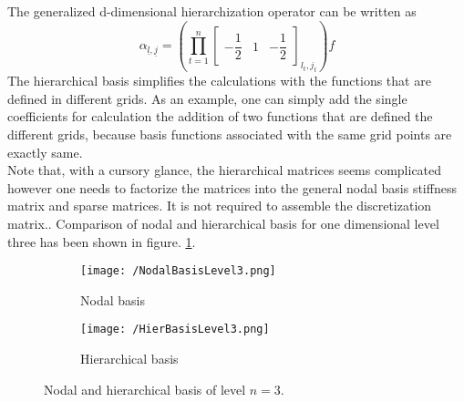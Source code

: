 The generalized d-dimensional hierarchization operator can be written as
\begin{equation}
    \alpha_{\underline{l},\underline{j}} = \left( \prod_{t=1}^{n}
    \left[
    \begin{array}{ccc}
	    -\dfrac{1}{2} & 1 & -\dfrac{1}{2}
    \end{array}
    \right]_{l_t,j_t}
     \right) f
\end{equation}
The hierarchical basis simplifies the calculations with the functions that are defined in different grids. As an example, one can simply add the single coefficients for calculation the addition of two functions that are defined the different grids, because basis functions associated with the same grid points are exactly same\cite{Griebel1992b}.\\
Note that, with a cursory glance, the hierarchical matrices seems complicated however one needs to factorize the matrices into the general nodal basis stiffness matrix and sparse matrices. It is not required to assemble the discretization matrix.\cite{Yserentant1986}. 
Comparison of nodal and hierarchical basis for one dimensional level three has been shown in figure. \ref{fig:NodalHierBasisLevel3}.

\begin{figure}[h]
	\centering
    \begin{subfigure}[b]{0.49\textwidth}
	    \texttt{[image: /NodalBasisLevel3.png]}
		\centering
        \caption{Nodal basis}
    \end{subfigure} 
    \begin{subfigure}[b]{0.49\textwidth}    
	    \texttt{[image: /HierBasisLevel3.png]}
		\centering    
	 \caption{Hierarchical basis}
    \end{subfigure} 
    \caption{Nodal and hierarchical basis of level $n=3$. }
    \label{fig:NodalHierBasisLevel3}
\end{figure}		

